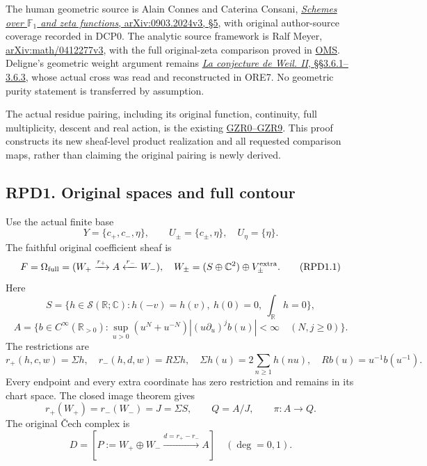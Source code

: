 The human geometric source is Alain Connes and Caterina Consani,
\href{https://arxiv.org/abs/0903.2024v3}{\emph{Schemes over
\(\mathbb F_1\) and zeta functions}, arXiv:0903.2024v3, §5}, with
original author-source coverage recorded in DCP0. The analytic source
framework is Ralf Meyer,
\href{https://arxiv.org/abs/math/0412277v3}{arXiv:math/0412277v3}, with
the full original-zeta comparison proved in
\href{https://github.com/KokunoYumeto/zeta-function-research-reader/blob/36a82ecca98addb8a98b48204e349737856c7223/workbenches/splitzero-tandem/continuations/20260924-cohomology-weight-and-character-lifts/original-character-lifting/tau_lifting_weights_20260924/ORIGINAL_MELLIN_SPECTRAL_SYNTHESIS.md}{OMS}.
Deligne's geometric weight argument remains
\href{https://www.numdam.org/item/PMIHES_1980__52__137_0/}{\emph{La
conjecture de Weil. II}, §§3.6.1--3.6.3}, whose actual cross was read
and reconstructed in ORE7. No geometric purity statement is transferred
by assumption.

The actual residue pairing, including its original function, continuity,
full multiplicity, descent and real action, is the existing
\href{https://github.com/KokunoYumeto/zeta-function-research-reader/blob/36a82ecca98addb8a98b48204e349737856c7223/workbenches/splitzero-tandem/continuations/20260924-cohomology-weight-and-character-lifts/original-character-lifting/tau_lifting_weights_20260924/GLOBAL_ORIGINAL_ZETA_RESIDUE_DUALITY_INDEPENDENT.md}{GZR0--GZR9}.
This proof constructs its new sheaf-level product realization and all
requested comparison maps, rather than claiming the original pairing is
newly derived.

\subsection{RPD1. Original spaces and full
contour}\label{rpd1.-original-spaces-and-full-contour}

Use the actual finite base \[
Y=\{c_+,c_-,\eta\},\qquad
U_\pm=\{c_\pm,\eta\},\quad U_\eta=\{\eta\}.
\] The faithful original coefficient sheaf is \[
F=\Omega_{\rm full}
=(W_+\xrightarrow{r_+}A\xleftarrow{r_-}W_-),
\quad
W_\pm=(S\oplus\mathbb C^2)\oplus V_\pm^{\rm extra}.
\tag{RPD1.1}
\] Here \[
S=\{h\in\mathcal S(\mathbb R;\mathbb C):
h(-v)=h(v),\ h(0)=0,\ \int_{\mathbb R}h=0\},
\] \[
A=\{b\in C^\infty(\mathbb R_{>0}):
\sup_{u>0}(u^N+u^{-N})|(u\partial_u)^jb(u)|<\infty
\quad(N,j\ge0)\}.
\] The restrictions are \[
r_+(h,c,w)=\Sigma h,\quad r_-(h,d,w)=R\Sigma h,\quad
\Sigma h(u)=2\sum_{n\ge1}h(nu),\quad Rb(u)=u^{-1}b(u^{-1}).
\tag{RPD1.2}
\] Every endpoint and every extra coordinate has zero restriction and
remains in its chart space. The closed image theorem gives \[
r_+(W_+)=r_-(W_-)=J=\Sigma S,\qquad Q=A/J,\qquad \pi:A\to Q.
\] The original Čech complex is \[
D=[P:=W_+\oplus W_-\xrightarrow{d=r_+-r_-}A]
\quad(\deg=0,1).
\tag{RPD1.3}
\]

